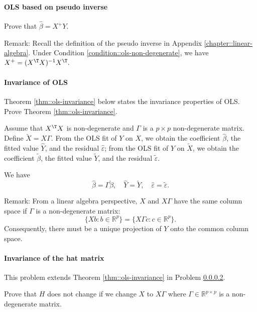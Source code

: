\paragraph{OLS based on pseudo inverse}\label{hw3::ols-pseudoinverse}

Prove that $\hat\beta = X^{+} Y$.


Remark: Recall the definition of the pseudo inverse in Appendix \ref{chapter::linear-algebra}. Under Condition \ref{condition::ols-non-degenerate}, we have $X^{+} = (X^{\T} X)^{-1} X^{\T} .$


\paragraph{Invariance of OLS}\label{hw3::invariance-ols}


Theorem \ref{thm::ols-invariance} below states the invariance properties of OLS. Prove Theorem \ref{thm::ols-invariance}.


\begin{theorem}
\label{thm::ols-invariance}
Assume that $X^{\T} X$ is non-degenerate and $\Gamma$ is a $p\times p$ non-degenerate matrix. Define $\tilde{X}=X\Gamma$. 
From the OLS fit of $Y$ on $X$, we obtain the coefficient $\hat{\beta}$, the fitted value $\hat{Y}$, and the residual $\hat{\varepsilon}$; from the OLS fit of $Y$ on $\tilde{X}$, we obtain the coefficient $\tilde{\beta}$, the fitted value $\tilde{Y}$, and the residual $\tilde{\varepsilon}$. 

We have 
$$
\hat{\beta} = \Gamma \tilde{\beta},\quad
\hat{Y} = \tilde{Y},\quad 
\hat{\varepsilon} = \tilde{\varepsilon}. 
$$
\end{theorem}




Remark: From a linear algebra perspective, $X$ and $X\Gamma$ have the same column space if $\Gamma$ is a non-degenerate matrix:
$$ 
\{   Xb : b\in\mathbb{R}^p \} = \{   X\Gamma c : c\in\mathbb{R}^p \} .
$$
Consequently, there must be a unique projection of $Y$ onto the common column space.  



\paragraph{Invariance of the hat matrix}\label{hw03::invariance-of-H}


This problem extends Theorem \ref{thm::ols-invariance} in Problem \ref{hw3::invariance-ols}. 

Prove that $H$ does not change if we change $X$ to $X\Gamma$ where $\Gamma \in \mathbb{R}^{p\times p}$ is a non-degenerate matrix.  



